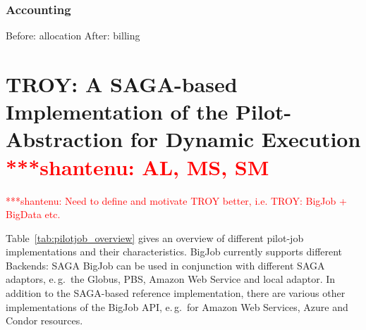 \documentclass[conference,final]{IEEEtran}
\newcommand{\jhanote}[1]{ {\textcolor{red} { ***shantenu: #1 }}}
\newcommand{\jhanote}[1]{}
\begin{document}
\subsubsection{Accounting}
Before: allocation
After: billing 

\section{TROY: A SAGA-based Implementation of the Pilot-Abstraction
  for Dynamic Execution \jhanote{AL, MS, SM}}

\jhanote{Need to define and motivate TROY better, i.e. TROY: BigJob +
  BigData etc.}

Table~\ref{tab:pilotjob_overview} gives an overview of different
pilot-job implementations and their characteristics. BigJob currently
supports different Backends: SAGA BigJob can be used in conjunction
with different SAGA adaptors, e.\,g.\ the Globus, PBS, Amazon Web
Service and local adaptor. In addition to the SAGA-based reference
implementation, there are various other implementations of the BigJob
API, e.\,g.\ for Amazon Web Services, Azure and Condor resources.
\end{document}
